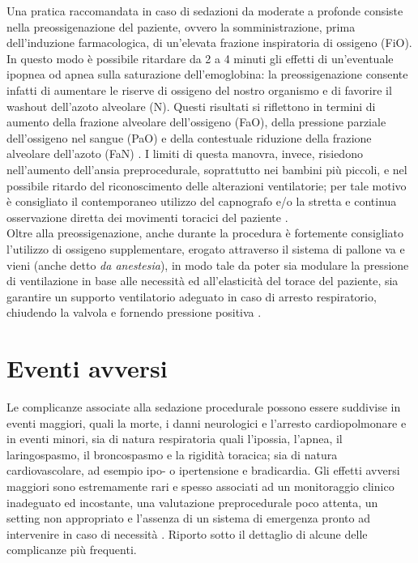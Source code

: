 Una pratica raccomandata in caso di sedazioni da moderate a profonde consiste nella preossigenazione del paziente, ovvero la somministrazione, prima dell'induzione farmacologica, di un'elevata frazione inspiratoria di ossigeno (FiO). In questo modo è possibile ritardare da 2 a 4 minuti gli effetti di un'eventuale ipopnea od apnea sulla saturazione dell'emoglobina: la preossigenazione consente infatti di aumentare le riserve di ossigeno del nostro organismo e di favorire il washout dell'azoto alveolare (N). Questi risultati si riflettono in termini di aumento della frazione alveolare dell'ossigeno (FaO), della pressione parziale dell'ossigeno nel sangue (PaO) e della contestuale riduzione della frazione alveolare dell'azoto (FaN) \cite{Nimmagadda2017}.
I limiti di questa manovra, invece, risiedono nell'aumento dell'ansia preprocedurale, soprattutto nei bambini più piccoli, e nel possibile ritardo del riconoscimento delle alterazioni ventilatorie; per tale motivo è consigliato il contemporaneo utilizzo del capnografo e/o la stretta e continua osservazione diretta dei movimenti toracici del paziente \cite{Fu2004}. 
\\Oltre alla preossigenazione, anche durante la procedura è fortemente consigliato l'utilizzo di ossigeno supplementare, erogato attraverso il sistema di pallone va e vieni (anche detto \emph{da anestesia}), in modo tale da poter sia modulare la pressione di ventilazione in base alle necessità ed all'elasticità del torace del paziente, sia garantire un supporto ventilatorio adeguato in caso di arresto respiratorio, chiudendo la valvola e fornendo pressione positiva \cite{Simeupsedazione}.

\section{Eventi avversi}

Le complicanze associate alla sedazione procedurale possono essere suddivise in eventi maggiori, quali la morte, i danni neurologici e l'arresto cardiopolmonare e in eventi minori, sia di natura respiratoria quali l'ipossia, l'apnea, il laringospasmo, il broncospasmo e la rigidità toracica; sia di natura cardiovascolare, ad esempio ipo- o ipertensione e bradicardia. Gli effetti avversi maggiori sono estremamente rari e spesso associati ad un monitoraggio clinico inadeguato ed incostante, una valutazione preprocedurale poco attenta, un setting non appropriato e l'assenza di un sistema di emergenza pronto ad intervenire in caso di necessità \cite{Uptodatesed}.
Riporto sotto il dettaglio di alcune delle complicanze più frequenti.

